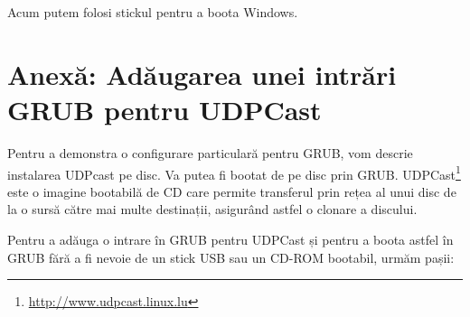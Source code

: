 Acum putem folosi stickul pentru a boota Windows.

\section{Anexă: Adăugarea unei intrări GRUB pentru UDPCast}
\label{sec:boot:updcast}

Pentru a demonstra o configurare particulară pentru GRUB, vom descrie instalarea UDPcast pe disc.
Va putea fi bootat de pe disc prin GRUB.
 UDPCast\footnote{\url{http://www.udpcast.linux.lu}} este o imagine bootabilă de CD care permite transferul prin rețea al unui disc de la o sursă către mai multe destinații, asigurând astfel o clonare a discului.

Pentru a adăuga o intrare în GRUB pentru UDPCast și pentru a boota astfel în GRUB fără a fi nevoie de un stick USB sau un CD-ROM bootabil, urmăm pașii:


